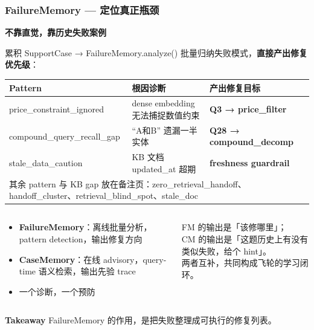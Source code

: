 \documentclass[aspectratio=169,10pt]{beamer}
\newcommand{\takeaway}[1]{%
  \vfill%
  \begin{tcolorbox}[
    colback=Ctakebg, colframe=Ctakebg,
    arc=0pt, boxrule=0pt,
    left=7pt, right=7pt, top=4pt, bottom=4pt,
    width=\linewidth, nobeforeafter
  ]%
    {\scriptsize\color{white}\textbf{Takeaway}\enspace%
     \color{white!88!Ctakebg}#1}%
  \end{tcolorbox}%
}
\newcommand{\hi}[1]{{\bfseries\color{Cgreen}#1}}      %
\newcommand{\mono}[1]{{\ttfamily\small\color{Cblue!90!black}#1}}  %
\begin{document}
\begin{frame}
\frametitle{FailureMemory — 定位真正瓶颈}

{\small\bfseries\color{Cmuted}不靠直觉，靠历史失败案例}\\[0.08cm]
\begin{tcolorbox}[tcblue]
\footnotesize 累积 SupportCase → \mono{FailureMemory.analyze()} 批量归纳失败模式，\textbf{直接产出修复优先级}：
\end{tcolorbox}

{\footnotesize\renewcommand{\arraystretch}{0.8}

\begin{tabularx}{\textwidth}{l >{\hsize=1.1\hsize}X >{\hsize=0.9\hsize}X}
\toprule
\bfseries Pattern & \bfseries 根因诊断 & \bfseries 产出修复目标 \\
\midrule
\rowcolor{Cgraylt}
\mono{price\_constraint\_ignored}  & dense embedding 无法捕捉数值约束 & \hi{Q3 → price\_filter} \\
\mono{compound\_query\_recall\_gap} & ``A和B'' 遗漏一半实体 & \hi{Q28 → compound\_decomp} \\
\rowcolor{Cgraylt}
\mono{stale\_data\_caution}        & KB 文档 \mono{updated\_at} 超期 & \hi{freshness guardrail} \\
\bottomrule
\multicolumn{3}{p{\textwidth}}{\scriptsize 其余 pattern 与 KB gap 放在备注页：\mono{zero\_retrieval\_handoff}、\mono{handoff\_cluster}、\mono{retrieval\_blind\_spot}、\mono{stale\_doc}}
\end{tabularx}}

\begin{columns}[T]
\begin{tcolorbox}[tcgray, title={\color{Ctextdark}FM 与 CM 的分工}]
\footnotesize\begin{itemize}\setlength\itemsep{0.12em}
  \item \textbf{FailureMemory}：离线批量分析，pattern detection，输出修复方向
  \item \textbf{CaseMemory}：在线 advisory，query-time 语义检索，输出先验 trace
  \item {\color{Cmuted}一个诊断，一个预防}
\end{itemize}
\end{tcolorbox}

\begin{tcolorbox}[tcblue]
\footnotesize FM 的输出是「该修哪里」；\\CM 的输出是「这题历史上有没有类似失败，给个 hint」。\\[0.15em]
两者互补，共同构成飞轮的学习闭环。
\end{tcolorbox}
\end{columns}

\takeaway{FailureMemory 的作用，是把失败整理成可执行的修复列表。}
\end{frame}
\end{document}
